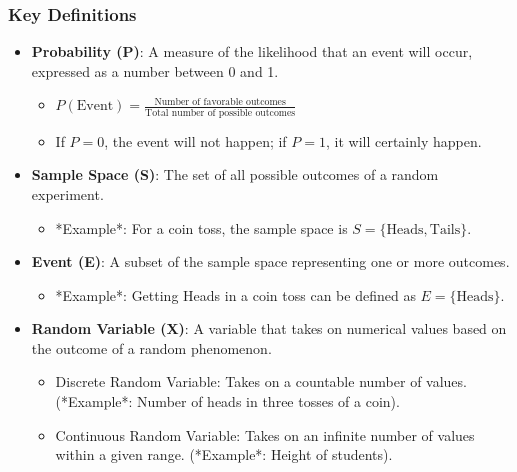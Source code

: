 \documentclass[aspectratio=169]{beamer}
\begin{document}
\begin{frame}[fragile]
    \frametitle{Key Definitions}
    \begin{itemize}
        \item \textbf{Probability (P)}: A measure of the likelihood that an event will occur, expressed as a number between 0 and 1.
        \begin{itemize}
            \item \( P(\text{Event}) = \frac{\text{Number of favorable outcomes}}{\text{Total number of possible outcomes}} \)
            \item If \( P = 0 \), the event will not happen; if \( P = 1 \), it will certainly happen.
        \end{itemize}
        
        \item \textbf{Sample Space (S)}: The set of all possible outcomes of a random experiment. 
        \begin{itemize}
            \item *Example*: For a coin toss, the sample space is \( S = \{\text{Heads}, \text{Tails}\} \).
        \end{itemize}
        
        \item \textbf{Event (E)}: A subset of the sample space representing one or more outcomes.
        \begin{itemize}
            \item *Example*: Getting Heads in a coin toss can be defined as \( E = \{\text{Heads}\} \).
        \end{itemize}
        
        \item \textbf{Random Variable (X)}: A variable that takes on numerical values based on the outcome of a random phenomenon.
        \begin{itemize}
            \item Discrete Random Variable: Takes on a countable number of values. (*Example*: Number of heads in three tosses of a coin).
            \item Continuous Random Variable: Takes on an infinite number of values within a given range. (*Example*: Height of students).
        \end{itemize}
    \end{itemize}
\end{frame}
\end{document}

